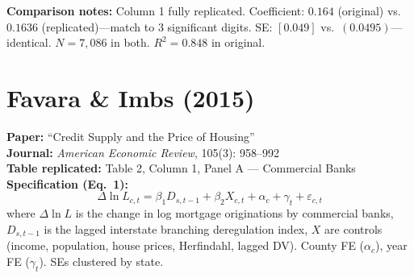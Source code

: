 \documentclass[11pt,a4paper]{article}
\begin{document}
\vspace{1cm}
\textbf{Comparison notes:} Column 1 fully replicated. Coefficient: $0.164$ (original) vs.\ $0.1636$ (replicated)---match to 3 significant digits. SE: $[0.049]$ vs.\ $(0.0495)$---identical. $N = 7{,}086$ in both. $R^2 = 0.848$ in original.

\newpage

\section{Favara \& Imbs (2015)}

\textbf{Paper:} ``Credit Supply and the Price of Housing''\\
\textbf{Journal:} \textit{American Economic Review}, 105(3): 958--992\\
\textbf{Table replicated:} Table 2, Column 1, Panel A --- Commercial Banks\\
\textbf{Specification (Eq.\ 1):}
\[
\Delta\ln L_{c,t} = \beta_1 D_{s,t-1} + \beta_2 X_{c,t} + \alpha_c + \gamma_t + \varepsilon_{c,t}
\]
where $\Delta\ln L$ is the change in log mortgage originations by commercial banks, $D_{s,t-1}$ is the lagged interstate branching deregulation index, $X$ are controls (income, population, house prices, Herfindahl, lagged DV). County FE ($\alpha_c$), year FE ($\gamma_t$). SEs clustered by state.

\vspace{0.3cm}
\noindent{}
\end{document}
